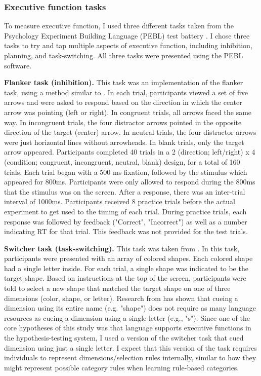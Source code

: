 \documentclass[../dissertation.tex]{subfiles}
\begin{document}
\subsubsection{Executive function tasks} 
To measure executive function, I used three different tasks taken from the Psychology Experiment Building Language (PEBL) test battery \citep{Mueller2014}. I chose three tasks to try and tap multiple aspects of executive function, including inhibition, planning, and task-switching. All three tasks were presented using the PEBL software.\par
\textbf{Flanker task (inhibition).} This task was an implementation of the \citet{Eriksen1979} flanker task, using a method similar to \citet{Stins2007}. In each trial, participants viewed a set of five arrows and were asked to respond based on the direction in which the center arrow was pointing (left or right). In congruent trials, all arrows faced the same way. In incongruent trials, the four distractor arrows pointed in the opposite direction of the target (center) arrow. In neutral trials, the four distractor arrows were just horizontal lines without arrowheads. In blank trials, only the target arrow appeared. Participants completed 40 trials in a 2 (direction; left/right) x 4 (condition; congruent, incongruent, neutral, blank) design, for a total of 160 trials. Each trial began with a 500 ms fixation, followed by the stimulus which appeared for 800ms. Participants were only allowed to respond during the 800ms that the stimulus was on the screen. After a response, there was an inter-trial interval of 1000ms. Participants received 8 practice trials before the actual experiment to get used to the timing of each trial. During practice trials, each response was followed by feedback ("Correct", "Incorrect") as well as a number indicating RT for that trial. This feedback was not provided for the test trials. \par
\textbf{Switcher task (task-switching).} This task was taken from \citet{Anderson2012}. In this task, participants were presented with an array of colored shapes. Each colored shape had a single letter inside. For each trial, a single shape was indicated to be the target shape. Based on instructions at the top of the screen, participants were told to select a new shape that matched the target shape on one of three dimensions (color, shape, or letter). Research from \citet{Miyake2004} has shown that cueing a dimension using its entire name (e.g. "shape") does not require as many language resources as cueing a dimension using a single letter (e.g., "s"). Since one of the core hypotheses of this study was that language supports executive functions in the hypothesis-testing system, I used a version of the switcher task that cued dimension using just a single letter. I expect that this version of the task requires individuals to represent dimensions/selection rules internally, similar to how they might represent possible category rules when learning rule-based categories. \par
\end{document}
